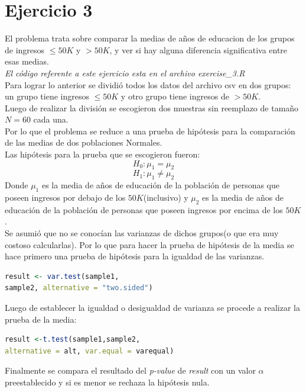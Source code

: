 \documentclass[10pt,twocolumn,a4paper]{article}
\begin{document}
\section*{Ejercicio 3}
El problema trata sobre comparar la medias de años de educacion de los grupos de ingresos $\le50K$ y $>50K$, y ver si hay alguna diferencia significativa entre esas medias.\\
\textit{El c\'odigo referente a este ejercicio esta en el archivo exercise\_3.R}\\
Para lograr lo anterior se dividi\'o todos los datos del archivo csv en dos grupos: un grupo tiene ingresos $\le 50K$ y otro grupo tiene ingresos de $>50K$.\\
Luego de realizar la divisi\'on se escogieron dos muestras sin reemplazo de tama\~no $N= 60$ cada una.\\
Por lo que el problema se reduce a una prueba de hipótesis para la comparación de las medias de dos poblaciones Normales.\\
Las hip\'otesis para la prueba que se escogieron fueron:
$$
	H_0: \mu_1 = \mu_2
$$
$$
	H_1: \mu_1 \ne \mu_2
$$
Donde $\mu_1$ es la media de a\~nos de educaci\'on de la poblaci\'on de personas que poseen ingresos por debajo de los $50K$(inclusivo) y $\mu_2$ es la media de a\~nos de educaci\'on de la poblaci\'on de personas que poseen ingresos por encima de los $50K$.\\
Se asumi\'o que no se conoc\'ian las varianzas de dichos grupos(o que era muy costoso calcularlas). Por lo que para hacer la prueba de hip\'otesis de la media se hace primero una prueba de hip\'otesis para la igualdad de las varianzas.

\begin{lstlisting}[language=R,title=Parte del codigo para la hipotesis de varianza]
result <- var.test(sample1,
sample2, alternative = "two.sided")
\end{lstlisting}

Luego de establecer la igualdad o desigualdad de varianza se procede a realizar la prueba de la media:

\begin{lstlisting}[language=R,title=Parte del codigo para la hipotesis de la media]
result <-t.test(sample1,sample2, 
alternative = alt, var.equal = varequal)
\end{lstlisting}

Finalmente se compara el resultado del \textit{p-value} de \textit{result} con un valor $\alpha$ preestablecido y si es menor se rechaza la hip\'otesis nula.
\end{document}
